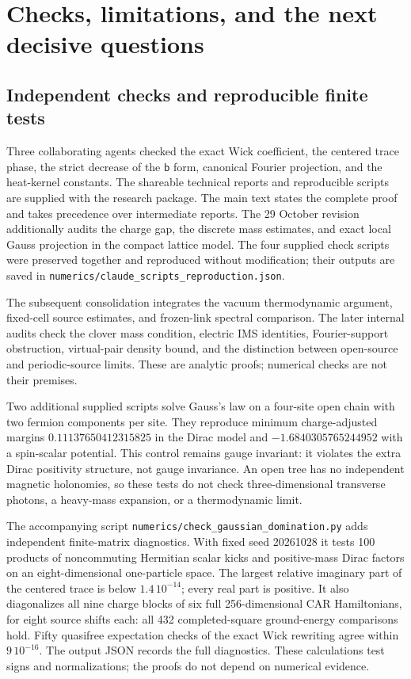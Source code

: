 \section{Checks, limitations, and the next decisive questions}
\subsection{Independent checks and reproducible finite tests}
Three collaborating agents checked the exact Wick coefficient, the
centered trace phase, the strict decrease of the $\mathsf b$ form,
canonical Fourier projection, and the heat-kernel constants.
The shareable technical reports and reproducible scripts are supplied
with the research package.
The main text states the complete proof and takes precedence over
intermediate reports.
The 29 October revision additionally audits the charge gap, the discrete
mass estimates, and exact local Gauss projection in the compact lattice
model. The four supplied check scripts were preserved together and
reproduced without modification; their outputs are saved in
\texttt{numerics/claude\_scripts\_reproduction.json}.

The subsequent consolidation integrates the vacuum thermodynamic
argument, fixed-cell source estimates, and frozen-link spectral
comparison. The later internal audits check the clover mass condition,
electric IMS identities, Fourier-support obstruction, virtual-pair
density bound, and the distinction between open-source and periodic-source
limits. These are analytic proofs; numerical checks are not their premises.

Two additional supplied scripts solve Gauss's law on a four-site open
chain with two fermion components per site. They reproduce minimum
charge-adjusted margins $0.11137650412315825$ in the Dirac model and
$-1.6840305765244952$ with a spin-scalar potential. This control
remains gauge invariant: it violates the extra Dirac positivity
structure, not gauge invariance. An open tree has no independent
magnetic holonomies, so these tests do not check three-dimensional
transverse photons, a heavy-mass expansion, or a thermodynamic limit.

The accompanying script \texttt{numerics/check\_gaussian\_domination.py}
adds independent finite-matrix diagnostics. With fixed seed 20261028 it
tests 100 products of noncommuting Hermitian scalar kicks and positive-mass
Dirac factors on an eight-dimensional one-particle space. The largest
relative imaginary part of the centered trace is below $1.4\,10^{-14}$;
every real part is positive. It also diagonalizes all nine charge blocks
of six full 256-dimensional CAR Hamiltonians, for eight source shifts
each: all 432 completed-square ground-energy comparisons hold.
Fifty quasifree expectation checks of the exact Wick rewriting agree
within $9\,10^{-16}$. The output JSON records the full diagnostics.
These calculations test signs and normalizations; the proofs do not
depend on numerical evidence.

